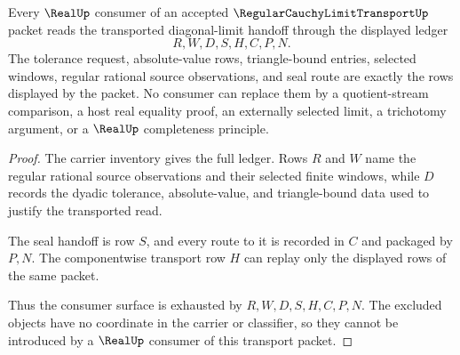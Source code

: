 \begin{theorem}
\label{thm:regular-cauchy-limit-transport-ledger-exactness}
Every $\RealUp$ consumer of an accepted $\RegularCauchyLimitTransportUp$ packet reads the transported diagonal-limit handoff through the displayed ledger
$$
R,W,D,S,H,C,P,N.
$$
The tolerance request, absolute-value rows, triangle-bound entries, selected windows, regular rational source observations, and seal route are exactly the rows displayed by the packet. No consumer can replace them by a quotient-stream comparison, a host real equality proof, an externally selected limit, a trichotomy argument, or a $\RealUp$ completeness principle.
\end{theorem}
\begin{proof}
The carrier inventory gives the full ledger. Rows $R$ and $W$ name the regular rational source observations and their selected finite windows, while $D$ records the dyadic tolerance, absolute-value, and triangle-bound data used to justify the transported read.

The seal handoff is row $S$, and every route to it is recorded in $C$ and packaged by $P,N$. The componentwise transport row $H$ can replay only the displayed rows of the same packet.

Thus the consumer surface is exhausted by $R,W,D,S,H,C,P,N$. The excluded objects have no coordinate in the carrier or classifier, so they cannot be introduced by a $\RealUp$ consumer of this transport packet.
\end{proof}

